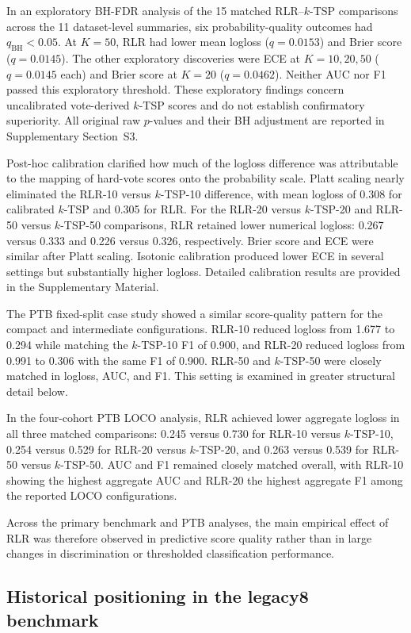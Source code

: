 \documentclass[preprint,12pt,a4paper]{elsarticle}
\begin{document}
In an exploratory BH-FDR analysis of the 15 matched RLR--$k$-TSP comparisons across the 11 dataset-level summaries, six probability-quality outcomes had $q_{\mathrm{BH}}<0.05$. At $K=50$, RLR had lower mean logloss ($q=0.0153$) and Brier score ($q=0.0145$). The other exploratory discoveries were ECE at $K=10,20,50$ ($q=0.0145$ each) and Brier score at $K=20$ ($q=0.0462$). Neither AUC nor F1 passed this exploratory threshold. These exploratory findings concern uncalibrated vote-derived $k$-TSP scores and do not establish confirmatory superiority. All original raw $p$-values and their BH adjustment are reported in Supplementary Section~S3.

Post-hoc calibration clarified how much of the logloss difference was attributable to the mapping of hard-vote scores onto the probability scale. Platt scaling nearly eliminated the RLR-10 versus $k$-TSP-10 difference, with mean logloss of 0.308 for calibrated $k$-TSP and 0.305 for RLR. For the RLR-20 versus $k$-TSP-20 and RLR-50 versus $k$-TSP-50 comparisons, RLR retained lower numerical logloss: 0.267 versus 0.333 and 0.226 versus 0.326, respectively. Brier score and ECE were similar after Platt scaling. Isotonic calibration produced lower ECE in several settings but substantially higher logloss. Detailed calibration results are provided in the Supplementary Material.

The PTB fixed-split case study showed a similar score-quality pattern for the compact and intermediate configurations. RLR-10 reduced logloss from 1.677 to 0.294 while matching the $k$-TSP-10 F1 of 0.900, and RLR-20 reduced logloss from 0.991 to 0.306 with the same F1 of 0.900. RLR-50 and $k$-TSP-50 were closely matched in logloss, AUC, and F1. This setting is examined in greater structural detail below.

In the four-cohort PTB LOCO analysis, RLR achieved lower aggregate logloss in all three matched comparisons: 0.245 versus 0.730 for RLR-10 versus $k$-TSP-10, 0.254 versus 0.529 for RLR-20 versus $k$-TSP-20, and 0.263 versus 0.539 for RLR-50 versus $k$-TSP-50. AUC and F1 remained closely matched overall, with RLR-10 showing the highest aggregate AUC and RLR-20 the highest aggregate F1 among the reported LOCO configurations.

Across the primary benchmark and PTB analyses, the main empirical effect of RLR was therefore observed in predictive score quality rather than in large changes in discrimination or thresholded classification performance.

\subsection{Historical positioning in the legacy8 benchmark}
\end{document}
